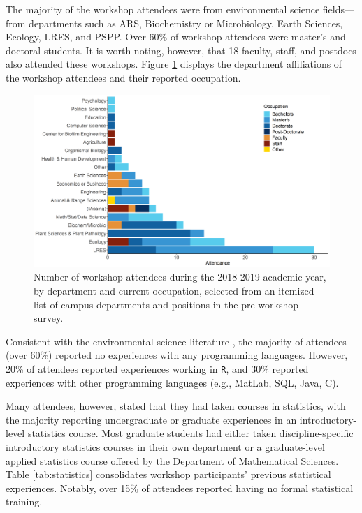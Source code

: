 \documentclass[12pt]{article}
\begin{document}
\noindent The majority of the workshop attendees were from environmental science
fields---from departments such as ARS, Biochemistry or
Microbiology, Earth Sciences, Ecology, LRES, and PSPP. Over 60\% of workshop attendees were
master's and doctoral students. It is worth noting, however, that 18 faculty,
staff, and postdocs also attended these workshops. Figure \ref{fig:departments}
displays the department affiliations of the workshop attendees and their
reported occupation. 

{
\begin{figure}[h!]
\centering
\includegraphics[width = \textwidth]{images/final_colors_attendance.png}
\caption{Number of workshop attendees during the 2018-2019 academic year, by
department and current occupation, selected from an itemized list of campus
departments and positions in the pre-workshop survey.}
    \label{fig:departments}
\end{figure}
}

\quad Consistent with the environmental science literature \citep{andelman, 
hampton, hernandez, carpentry}, the majority of attendees (over 60\%) reported
no experiences with any programming languages. However, 20\% of attendees 
reported experiences working in \texttt{R}, and 30\% reported experiences with
other programming languages (e.g., MatLab, SQL, Java, C). 

\quad Many attendees, however, stated that they had taken courses in statistics, 
with the majority reporting undergraduate or graduate experiences in an
introductory-level statistics course. Most graduate students had either taken 
discipline-specific introductory statistics courses in their own department or
a graduate-level applied statistics course offered by the Department of
Mathematical Sciences. Table \ref{tab:statistics} consolidates workshop
participants' previous statistical experiences. Notably, over 15\% of
attendees reported having no formal statistical training. 
\end{document}
